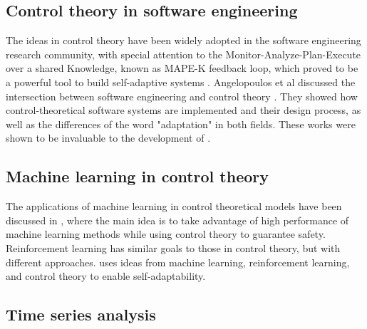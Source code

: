 
\subsection{Control theory in software engineering}

The ideas in control theory have been widely adopted in the software engineering research community, with special attention to the Monitor-Analyze-Plan-Execute over a shared Knowledge, known as MAPE-K feedback loop, which proved to be a powerful tool to build self-adaptive systems \cite{arcaini_modeling_2015, salehie_self-adaptive_2009, Brun2013, computing_architectural_2006, kephart_vision_2003, de_lemos_software_2013}. Angelopoulos et al discussed the intersection between software engineering and control theory \cite{filieri2015software}. They showed how control-theoretical software systems are implemented and their design process, as well as the differences of the word "adaptation" in both fields. These works were shown to be invaluable to the development of \projectname{}.

\subsection{Machine learning in control theory}
The applications of machine learning in control theoretical models have been discussed in \cite{Gillula10_FusingMachineLearningControlTheory}, where the main idea is to take advantage of high performance of machine learning methods while using control theory to guarantee safety. Reinforcement learning \cite{Sutton:1998:IRL:551283} has similar goals to those in control theory, but with different approaches. \projectname{} uses ideas from machine learning, reinforcement learning, and control theory to enable self-adaptability.

\subsection{Time series analysis}


